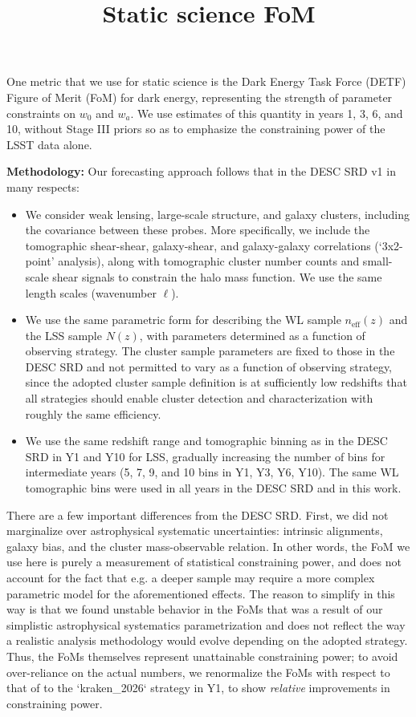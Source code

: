 \documentclass[a4paper,10pt]{article}
\title{Static science FoM}
\author{}
\date{}
\begin{document}
\maketitle

One metric that we use for static science is the Dark Energy Task Force (DETF) Figure of Merit (FoM)
for dark energy, representing the strength of parameter constraints on $w_0$ and $w_a$.  We use
estimates of this quantity in years 1, 3, 6, and 10, without Stage III priors so as to emphasize the
constraining power of the LSST data alone.

{\bf Methodology:} Our forecasting approach follows that in the DESC SRD v1 in many respects:

\begin{itemize}
\item We consider weak lensing, large-scale structure, and galaxy clusters, including the covariance
between these probes.  More specifically, we include the tomographic shear-shear, galaxy-shear, and
galaxy-galaxy correlations (`3x2-point’ analysis), along with tomographic cluster number counts and
small-scale shear signals to constrain the halo mass function. We use the same length scales
(wavenumber $\ell$). 
\item We use the same parametric form for describing the WL sample $n_\text{eff}(z)$ and the LSS
sample $N(z)$, with parameters determined as a function of observing strategy.  The cluster sample
parameters are fixed to those in the DESC SRD and not permitted to vary as a function of observing
strategy, since the adopted cluster sample definition is at sufficiently low redshifts that all
strategies should enable cluster detection and characterization with roughly the same efficiency.
\item We use the same redshift range and tomographic binning as in the DESC SRD in Y1 and Y10 for
LSS, gradually increasing the number of bins for intermediate years (5, 7, 9, and 10 bins in Y1, Y3,
Y6, Y10).  The same WL tomographic bins were used in all years in the DESC SRD and in this work.
\end{itemize}

There are a few important differences from the DESC SRD.  First, we did not marginalize over
astrophysical systematic uncertainties: intrinsic alignments, galaxy bias, and the cluster
mass-observable relation.  In other words, the FoM we use here is purely a measurement of
statistical constraining power, and does not account for the fact that e.g. a deeper sample may
require a more complex parametric model for the aforementioned effects. The reason to simplify in
this way is that we found unstable behavior in the FoMs that was a result of our simplistic
astrophysical systematics parametrization and does not reflect the way a realistic analysis
methodology would evolve depending on the adopted strategy.  Thus, the FoMs themselves represent
unattainable constraining power; to avoid over-reliance on the actual numbers, we renormalize the
FoMs with respect to that of to the `kraken\_2026` strategy in Y1, to show {\em relative}
improvements in constraining power.
\end{document}
